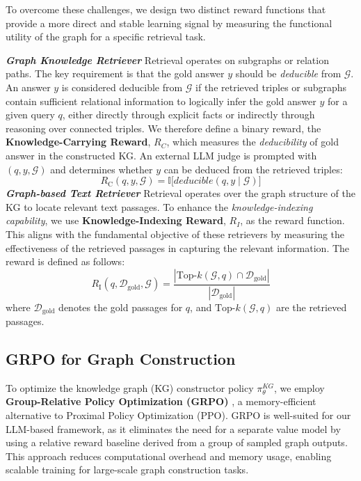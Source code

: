 \documentclass[11pt]{article}
\begin{document}
To overcome these challenges, we design two distinct reward functions that provide a more direct and stable learning signal by measuring the functional utility of the graph for a specific retrieval task.

\textbf{\textit{Graph Knowledge Retriever}} Retrieval operates on subgraphs or relation paths. The key requirement is that the gold answer $y$ should be \emph{deducible} from $\mathcal{G}$. An answer $y$ is considered deducible from $\mathcal{G}$ if the retrieved triples or subgraphs contain sufficient relational information to logically infer the gold answer $y$ for a given query $q$, either directly through explicit facts or indirectly through reasoning over connected triples. We therefore define a binary reward, the \textbf{Knowledge-Carrying Reward}, $R_C$, which measures the \emph{deducibility} of gold answer in the constructed KG. An external LLM judge is prompted with $(q, y, \mathcal{G})$ and determines whether $y$ can be deduced from the retrieved triples:
\begin{equation}
    R_{\text{C}}(q, y, \mathcal{G}) = \mathbb{I}\big[\textit{deducible}(q, y \mid \mathcal{G})\big]
\label{deducible_reward}
\end{equation}
\textbf{\textit{Graph-based Text Retriever}} Retrieval operates over the graph structure of the KG to locate relevant text passages. To enhance the \emph{knowledge-indexing capability}, we use \textbf{Knowledge-Indexing Reward}, $R_I$, as the reward function. This aligns with the fundamental objective of these retrievers by measuring the effectiveness of the retrieved passages in capturing the relevant information. The reward is defined as follows:
\begin{equation}
R_{\text{I}}(q, \mathcal{D}_{\text{gold}}, \mathcal{G}) = 
\frac{\left|\text{Top-}k(\mathcal{G}, q) \cap \mathcal{D}_{\text{gold}}\right|}
{\left|\mathcal{D}_{\text{gold}}\right|} 
\label{recall_reward}
\end{equation}
where $\mathcal{D}_{\text{gold}}$ denotes the gold passages for $q$, and $\text{Top-}k(\mathcal{G}, q)$ are the retrieved passages.

\subsection{GRPO for Graph Construction}

To optimize the knowledge graph (KG) constructor policy $\pi_\theta^{KG}$, we employ \textbf{Group-Relative Policy Optimization (GRPO)} \citep{shao_deepseekmath_2024}, a memory-efficient alternative to Proximal Policy Optimization (PPO). GRPO is well-suited for our LLM-based framework, as it eliminates the need for a separate value model by using a relative reward baseline derived from a group of sampled graph outputs. This approach reduces computational overhead and memory usage, enabling scalable training for large-scale graph construction tasks.
\end{document}
